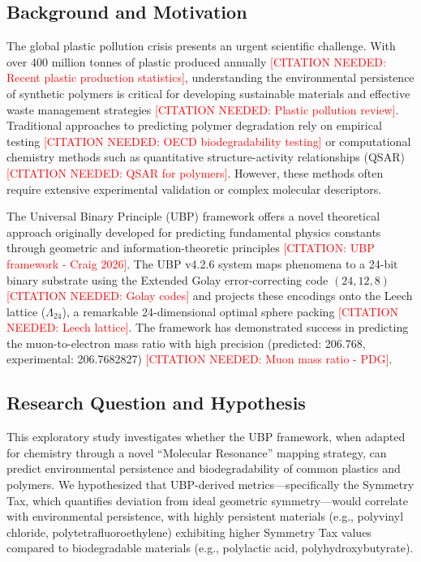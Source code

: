 \documentclass[11pt,letterpaper]{article}
\begin{document}

\subsection{Background and Motivation}

The global plastic pollution crisis presents an urgent scientific challenge. With over 400 million tonnes of plastic produced annually \textcolor{red}{[CITATION NEEDED: Recent plastic production statistics]}, understanding the environmental persistence of synthetic polymers is critical for developing sustainable materials and effective waste management strategies \textcolor{red}{[CITATION NEEDED: Plastic pollution review]}. Traditional approaches to predicting polymer degradation rely on empirical testing \textcolor{red}{[CITATION NEEDED: OECD biodegradability testing]} or computational chemistry methods such as quantitative structure-activity relationships (QSAR) \textcolor{red}{[CITATION NEEDED: QSAR for polymers]}. However, these methods often require extensive experimental validation or complex molecular descriptors.

The Universal Binary Principle (UBP) framework offers a novel theoretical approach originally developed for predicting fundamental physics constants through geometric and information-theoretic principles \textcolor{red}{[CITATION: UBP framework - Craig 2026]}. The UBP v4.2.6 system maps phenomena to a 24-bit binary substrate using the Extended Golay error-correcting code $(24,12,8)$ \textcolor{red}{[CITATION NEEDED: Golay codes]} and projects these encodings onto the Leech lattice ($\Lambda_{24}$), a remarkable 24-dimensional optimal sphere packing \textcolor{red}{[CITATION NEEDED: Leech lattice]}. The framework has demonstrated success in predicting the muon-to-electron mass ratio with high precision (predicted: 206.768, experimental: 206.7682827) \textcolor{red}{[CITATION NEEDED: Muon mass ratio - PDG]}.

\subsection{Research Question and Hypothesis}

This exploratory study investigates whether the UBP framework, when adapted for chemistry through a novel ``Molecular Resonance'' mapping strategy, can predict environmental persistence and biodegradability of common plastics and polymers. We hypothesized that UBP-derived metrics—specifically the Symmetry Tax, which quantifies deviation from ideal geometric symmetry—would correlate with environmental persistence, with highly persistent materials (e.g., polyvinyl chloride, polytetrafluoroethylene) exhibiting higher Symmetry Tax values compared to biodegradable materials (e.g., polylactic acid, polyhydroxybutyrate).
\end{document}

